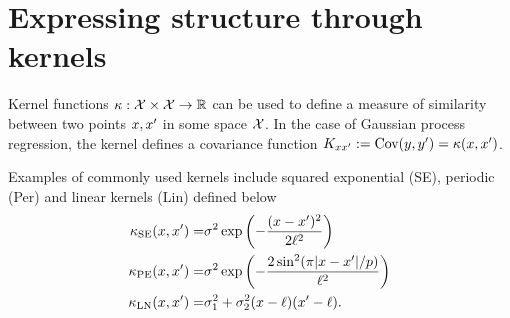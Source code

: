 \documentclass[twoside]{article}
\begin{document}


\section{Expressing structure through kernels}
\label{sec:Structure}

Kernel functions $\kappa : \mathcal{X} \times \mathcal{X} \to \mathbb{R}$ can be used to define a measure of similarity between two points $x, x'$ in some space $\mathcal{X}$.
In the case of Gaussian process regression, the kernel defines a covariance function ${K_{x x'} := \textrm{Cov}(y, y') = \kappa(x,x')}$.

Examples of commonly used kernels include squared exponential (SE), periodic (Per) and linear kernels (Lin) defined below
\begin{eqnarray}
\kappa_\textrm{SE}(x, x') = & \sigma^2\exp\left(-\frac{(x - x')^2}{2\ell^2}\right) \\
\kappa_\textrm{PE}(x, x') = & \sigma^2\exp\left(-\frac{2\sin^2(\pi|x - x'|/p)}{\ell^2}\right) \\
\kappa_\textrm{LN}(x, x') = & \sigma_1^2 + \sigma_2^2(x - \ell)(x' - \ell).
\end{eqnarray}
\end{document}

